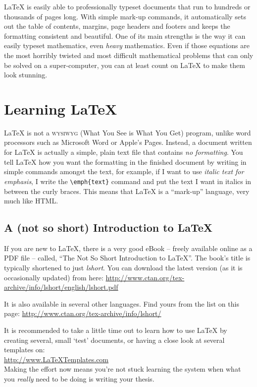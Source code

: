 \LaTeX{} is easily able to professionally typeset documents that run to hundreds or thousands of pages long. With simple mark-up commands, it automatically sets out the table of contents, margins, page headers and footers and keeps the formatting consistent and beautiful. One of its main strengths is the way it can easily typeset mathematics, even \emph{heavy} mathematics. Even if those equations are the most horribly twisted and most difficult mathematical problems that can only be solved on a super-computer, you can at least count on \LaTeX{} to make them look stunning.


\section{Learning \LaTeX{}}

\LaTeX{} is not a \textsc{wysiwyg} (What You See is What You Get) program, unlike word processors such as Microsoft Word or Apple's Pages. Instead, a document written for \LaTeX{} is actually a simple, plain text file that contains \emph{no formatting}. You tell \LaTeX{} how you want the formatting in the finished document by writing in simple commands amongst the text, for example, if I want to use \emph{italic text for emphasis}, I write the \verb|\emph{text}| command and put the text I want in italics in between the curly braces. This means that \LaTeX{} is a \enquote{mark-up} language, very much like HTML.

\subsection{A (not so short) Introduction to \LaTeX{}}

If you are new to \LaTeX{}, there is a very good eBook -- freely available online as a PDF file -- called, \enquote{The Not So Short Introduction to \LaTeX{}}. The book's title is typically shortened to just \emph{lshort}. You can download the latest version (as it is occasionally updated) from here:
\url{http://www.ctan.org/tex-archive/info/lshort/english/lshort.pdf}

It is also available in several other languages. Find yours from the list on this page: \url{http://www.ctan.org/tex-archive/info/lshort/}

It is recommended to take a little time out to learn how to use \LaTeX{} by creating several, small `test' documents, or having a close look at several templates on:\\ 
\url{http://www.LaTeXTemplates.com}\\ 
Making the effort now means you're not stuck learning the system when what you \emph{really} need to be doing is writing your thesis.

